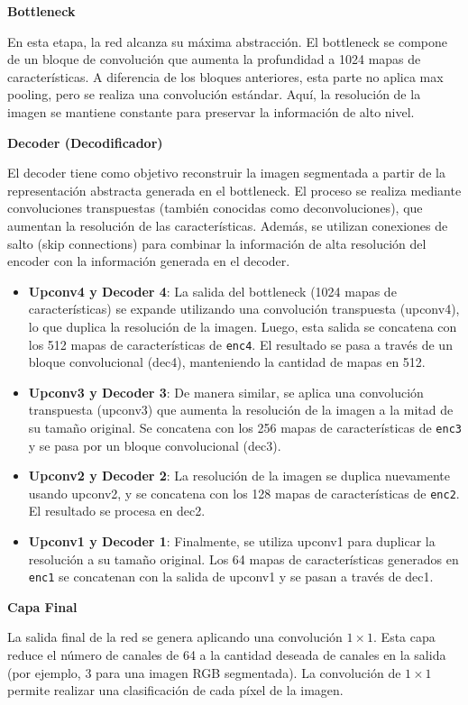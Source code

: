 \textbf{Bottleneck}

En esta etapa, la red alcanza su máxima abstracción. El bottleneck se compone de un bloque de convolución que aumenta la profundidad a 1024 mapas de características. A diferencia de los bloques anteriores, esta parte no aplica max pooling, pero se realiza una convolución estándar. Aquí, la resolución de la imagen se mantiene constante para preservar la información de alto nivel.

\textbf{Decoder (Decodificador)}

El decoder tiene como objetivo reconstruir la imagen segmentada a partir de la representación abstracta generada en el bottleneck. El proceso se realiza mediante convoluciones transpuestas (también conocidas como deconvoluciones), que aumentan la resolución de las características. Además, se utilizan conexiones de salto (skip connections) para combinar la información de alta resolución del encoder con la información generada en el decoder.

\begin{itemize}
    \item \textbf{Upconv4 y Decoder 4}: La salida del bottleneck (1024 mapas de características) se expande utilizando una convolución transpuesta (upconv4), lo que duplica la resolución de la imagen. Luego, esta salida se concatena con los 512 mapas de características de \texttt{enc4}. El resultado se pasa a través de un bloque convolucional (dec4), manteniendo la cantidad de mapas en 512.
    \item \textbf{Upconv3 y Decoder 3}: De manera similar, se aplica una convolución transpuesta (upconv3) que aumenta la resolución de la imagen a la mitad de su tamaño original. Se concatena con los 256 mapas de características de \texttt{enc3} y se pasa por un bloque convolucional (dec3).
    \item \textbf{Upconv2 y Decoder 2}: La resolución de la imagen se duplica nuevamente usando upconv2, y se concatena con los 128 mapas de características de \texttt{enc2}. El resultado se procesa en dec2.
    \item \textbf{Upconv1 y Decoder 1}: Finalmente, se utiliza upconv1 para duplicar la resolución a su tamaño original. Los 64 mapas de características generados en \texttt{enc1} se concatenan con la salida de upconv1 y se pasan a través de dec1.
\end{itemize}

\textbf{Capa Final}

La salida final de la red se genera aplicando una convolución $1 \times 1$. Esta capa reduce el número de canales de 64 a la cantidad deseada de canales en la salida (por ejemplo, 3 para una imagen RGB segmentada). La convolución de $1 \times 1$ permite realizar una clasificación de cada píxel de la imagen.

